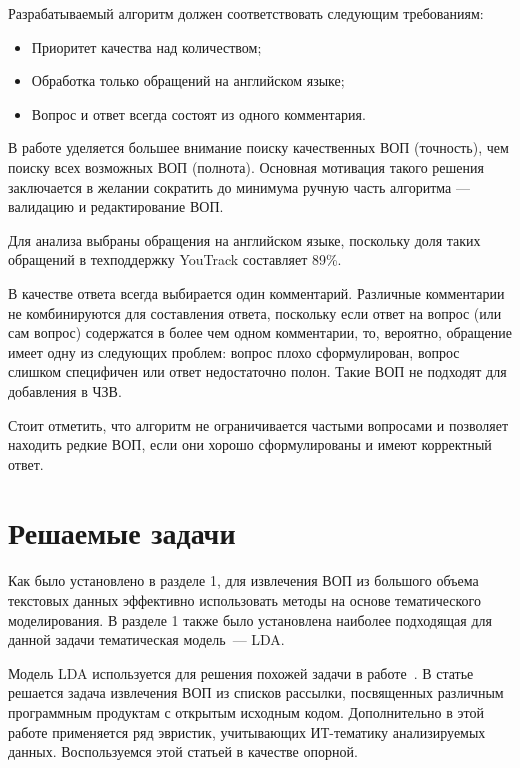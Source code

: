 Разрабатываемый алгоритм должен соответствовать следующим требованиям:

\begin{itemize}
\item Приоритет качества над количеством;
\item Обработка только обращений на английском языке;
\item Вопрос и ответ всегда состоят из одного комментария.
\end{itemize}

В работе уделяется большее внимание поиску качественных ВОП (точность), чем поиску всех возможных ВОП (полнота). Основная мотивация такого решения заключается в желании сократить до минимума ручную часть алгоритма — валидацию и редактирование ВОП.

Для анализа выбраны обращения на английском языке, поскольку доля таких обращений в техподдержку YouTrack составляет 89\%. 

В качестве ответа всегда выбирается один комментарий. Различные комментарии не комбинируются для составления ответа, поскольку если ответ на вопрос (или сам вопрос) содержатся в более чем одном комментарии, то, вероятно, обращение имеет одну из следующих проблем: вопрос плохо сформулирован, вопрос слишком специфичен или ответ недостаточно полон. Такие ВОП не подходят для добавления в ЧЗВ.

Стоит отметить, что  алгоритм не ограничивается частыми вопросами и позволяет находить редкие ВОП, если они хорошо сформулированы и имеют корректный ответ.

\section{Решаемые задачи}
\label{sec:tasks}

Как было установлено в разделе 1, для извлечения ВОП из большого объема текстовых данных эффективно использовать методы на основе тематического моделирования. В разделе 1 также было установлена наиболее подходящая для данной задачи тематическая модель~--- LDA.

Модель LDA используется для решения похожей задачи в работе~\cite{original}. В статье~\cite{original} решается задача извлечения ВОП из списков рассылки, посвященных различным программным продуктам с открытым исходным кодом. Дополнительно в этой работе применяется ряд эвристик, учитывающих ИТ-тематику анализируемых данных. Воспользуемся этой статьей в качестве опорной.

